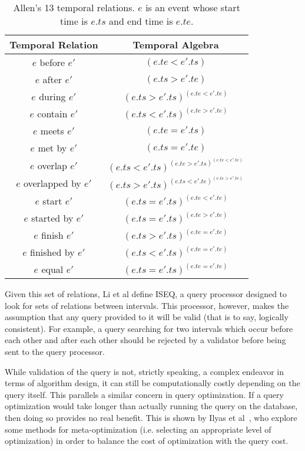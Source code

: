 \documentclass[10pt, journal]{IEEEtran}
\begin{document}
\begin{table}[!ht]\centering
\begin{tabular}{|c|c|}\hline
\textbf{Temporal Relation} & \textbf{Temporal Algebra}\\\hline
$e$ before $e'$ & $(e.te < e'.ts)$\\\hline
$e$ after $e'$ & $(e.ts > e'.te)$\\\hline
$e$ during $e'$ & $(e.ts > e'.ts) ^ (e.te < e'.te)$ \\\hline
$e$ contain $e'$ & $(e.ts < e'.ts) ^ (e.te > e'.te)$ \\\hline
$e$ meets $e'$ & $(e.te = e'.ts)$ \\\hline
$e$ met by $e'$ & $(e.ts = e'.te)$ \\\hline
$e$ overlap $e'$ & $(e.ts < e'.ts) ^ (e.te > e'.ts) ^ (e.te < e'.te)$ \\\hline
$e$ overlapped by $e'$ & $(e.ts > e'.ts) ^ (e.ts < e'.te) ^ (e.te > e'.te)$ \\\hline
$e$ start $e'$ & $(e.ts = e'.ts) ^ (e.te < e'.te)$ \\\hline
$e$ started by $e'$ & $(e.ts = e'.ts) ^ (e.te > e'.te)$ \\\hline
$e$ finish $e'$ & $(e.ts > e'.ts) ^ (e.te = e'.te)$ \\\hline
$e$ finished by $e'$ & $(e.ts < e'.ts) ^ (e.te = e'.te)$ \\\hline
$e$ equal $e'$ & $(e.ts = e'.ts) ^ (e.te = e'.te)$ \\\hline
\end{tabular}
\caption{Allen's 13 temporal relations. $e$ is an event whose start time is $e.ts$ and end time is $e.te$.}\label{tab:relations}
\end{table}

Given this set of relations, Li et al define ISEQ, a query processor designed to look for sets of relations between intervals. This processor, however, makes the assumption that any query provided to it will be valid (that is to say, logically consistent).  For example, a query searching for two intervals which occur before each other and after each other should be rejected by a validator before being sent to the query processor.

While validation of the query is not, strictly speaking, a complex endeavor in terms of algorithm design, it can still be computationally costly depending on the query itself.  This parallels a similar concern in query optimization.  If a query optimization would take longer than actually running the query on the database, then doing so  provides no real benefit.  This is shown by Ilyas et al~\cite{Ilyas:2003}, who explore some methods for meta-optimization (i.e. selecting an appropriate level of optimization) in order to balance the cost of optimization with the query cost.
\end{document}
